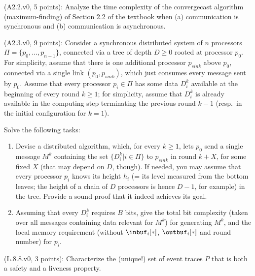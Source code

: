 \begin{Exc}{(A2.2.v0, 5 points):}
Analyze the time complexity of the convergecast algorithm
(maximum-finding) of Section 2.2 of the textbook when (a) communication is
synchronous and (b) communication is asynchronous.
\end{Exc}
\begin{Exc}{(A2.3.v0, 9 points):}
Consider a synchronous distributed system of $n$ processors
$\Pi=\{p_0,\dots,p_{n-1}\}$, connected via a tree of depth $D\geq0$
rooted at processor $p_0$. For simplicity, assume that there is
one additional processor $p_{sink}$ above $p_0$, connected via a single link
$(p_0,p_{sink})$, which just consumes every message sent by $p_0$.
Assume that every processor $p_i\in\Pi$ has
some data $D_i^k$ available at the beginning of every round $k\geq 1$;
for simplicity, assume that $D_i^k$ is already available in the
computing step terminating the previous round $k-1$ (resp.\
in the initial configuration for $k=1$).

Solve the following tasks:
\begin{enumerate}
\item[(1)] Devise a distributed algorithm, which, for every $k\geq 1$,
lets $p_0$ send a single message $M^k$ containing the set
$\{D_i^k| i\in\Pi\}$ to $p_{sink}$ in
round $k+X$, for some fixed $X$ (that may depend on $D$, though).
If needed, you may assume that every processor $p_i$ knows its
height $h_i$ (= its level measured from the bottom leaves;
the height of a chain of $D$ processors is hence $D-1$, for example) in
the tree. Provide a sound proof that it indeed achieves its
goal.

\item[(2)] Assuming that every $D_i^k$ requires $B$ bits,
give the total bit
complexity (taken over all messages containing data relevant for
$M^k$) for generating $M^k$, and the local memory requirement
(without $\inbuf_i[*]$, $\outbuf_i[*]$ and round number) for $p_i$.
\end{enumerate}
\end{Exc}
\begin{Exc}{(L.8.8.v0, 3 points):}
Characterize the (unique!) set of event traces $P$ that is both
a safety and a liveness property.

\end{Exc}
